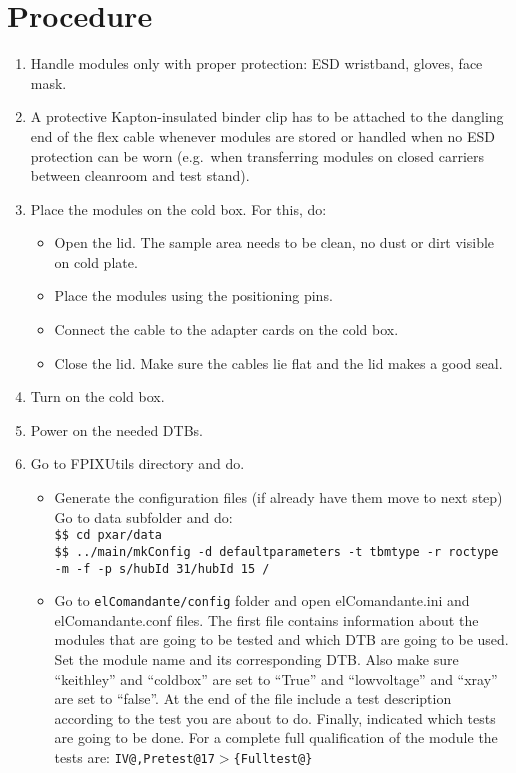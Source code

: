 \documentclass[12pt]{unlsilabsop}
\makeatletter
\newcommand{\at}{\makeatletter @\makeatother}
\makeatother
\begin{document}
\section{Procedure}

\begin{enumerate}
    \item Handle modules only with proper protection: ESD wristband, gloves, face mask.
    \item A protective Kapton-insulated binder clip has to be attached to the dangling end of the flex cable whenever modules are stored or handled when no ESD protection can be worn (e.g.~when transferring modules on closed carriers between cleanroom and test stand).
    \item Place the modules on the cold box. For this, do:
    \begin{itemize}
        \item Open the lid. The sample area needs to be clean, no dust or dirt visible on cold plate.
        \item Place the modules using the positioning pins.
        \item Connect the cable to the adapter cards on the cold box.
        \item Close the lid. Make sure the cables lie flat and the lid makes a good seal.
    \end{itemize}    
    \item Turn on 	the cold box. %
    \item Power on the needed DTBs.
    \item Go to FPIXUtils directory and do.
    \begin{itemize}
		\item Generate the configuration files (if already have them move to next step)\\
		Go to data subfolder and do:\\
		\texttt{\$\$ cd pxar/data}\\
		\texttt{\$\$ ../main/mkConfig -d defaultparameters -t tbmtype -r roctype -m -f -p \textsc{}s/hubId 31/hubId 15 	\textsc{}/}
		\item Go to \texttt{elComandante/config} folder and open elComandante.ini and elComandante.conf files. The first file contains information about the modules that are going to be tested and which DTB are going to be used. Set the module name and its corresponding DTB. Also make sure ``keithley'' and ``coldbox'' are set to ``True'' and ``lowvoltage'' and ``xray'' are set to ``false''. At the end of the file include a test description according to the test you are about to do. Finally, indicated which tests are going to be done. For a complete full qualification of the module the tests are: \texttt{IV\at 17,Pretest{\at}17$>$\{Fulltest\at 17\}}\\


\end{itemize}
\end{enumerate}
\end{document}
